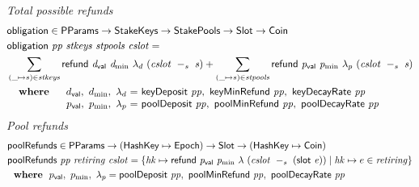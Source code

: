 \begin{figure}[htb]
  \emph{Total possible refunds}
  \begin{align*}
      & \fun{obligation} \in \PParams \to \StakeKeys \to \StakePools \to \Slot \to \Coin \\
      & \obligation{pp}{stkeys}{stpools}{cslot} =\\
      & \sum\limits_{(\_ \mapsto s) \in \var{stkeys}}
        \refund{d_{\mathsf{val}}}{d_{\min}}{\lambda_d}{(\slotminus{cslot}{s})}
        + \sum\limits_{(\_ \mapsto s) \in \var{stpools}}
        \refund{p_{\mathsf{val}}}{p_{\min}}{\lambda_p}{(\slotminus{cslot}{s})} \\
      &
      \begin{array}{lr@{~=~}l}
        \where
          & \dval,~d_{\min},~\lambda_d
          & \fun{keyDeposit}~\var{pp},~\fun{keyMinRefund}~\var{pp},~\fun{keyDecayRate}~\var{pp}
          \\
          & p_{\mathsf{val}},~p_{\min},~\lambda_p
          & \fun{poolDeposit}~\var{pp},~\fun{poolMinRefund}~\var{pp},~\fun{poolDecayRate}~\var{pp}
      \end{array}\\
  \end{align*}
  \emph{Pool refunds}
  \begin{align*}
      & \mathsf{poolRefunds} \in \mathsf{PParams} \to (\mathsf{HashKey} \mapsto \mathsf{Epoch}) \to \mathsf{Slot} \to
        (\mathsf{HashKey} \mapsto \mathsf{Coin}) \\
      & \mathsf{poolRefunds}~ \mathit{pp}~ \mathit{retiring}~ \mathit{cslot} = \left\{
        \mathit{hk}\mapsto
          \mathsf{refund}~ \mathit{p_{\mathsf{val}}}~ \mathit{p_{\min}}~ {\lambda}~ {(\mathit{cslot}~-_{s}~\mathit{(\mathsf{slot}~e)})}
          \mid
          \mathit{hk}\mapsto e\in\mathit{retiring}
        \right\}\\
      & ~ ~ \mathbf{where}~ ~  p_{\mathsf{val}},~p_{\min},~\lambda_p =
          \mathsf{poolDeposit}~\mathit{pp},~\mathsf{poolMinRefund}~\mathit{pp},~\mathsf{poolDecayRate}~\mathit{pp} \\
  \end{align*}


\end{figure}
